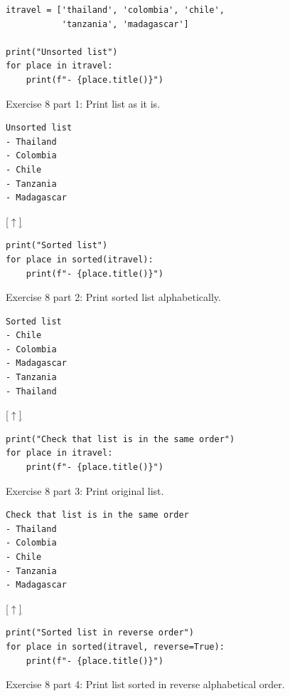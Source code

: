 \documentclass[10pt]{book}
\newenvironment{code}{\captionsetup{labelfont=bf, type=listing, name=Snippet, aboveskip=-3pt ,belowskip=15pt}}{}
\begin{document}
\begin{enumerate}
\label{org1a9df74}
\begin{code}
\begin{verbatim}
itravel = ['thailand', 'colombia', 'chile',
           'tanzania', 'madagascar']

print("Unsorted list")
for place in itravel:
    print(f"- {place.title()}")
\end{verbatim}
\caption{\label{lst:org1847dcf}Exercise 8 part 1: Print list as it is.}
\end{code}

\label{org1390465}
\begin{verbatim}
Unsorted list
- Thailand
- Colombia
- Chile
- Tanzania
- Madagascar
\end{verbatim}

\hyperref[sec:orge5f6a28]{{[}\(\uparrow\)]​}


\label{org4cc1f20}
\begin{code}
\begin{verbatim}
print("Sorted list")
for place in sorted(itravel):
    print(f"- {place.title()}")
\end{verbatim}
\caption{\label{lst:org3b2f0d3}Exercise 8 part 2: Print sorted list alphabetically.}
\end{code}

\label{org883c59e}
\begin{verbatim}
Sorted list
- Chile
- Colombia
- Madagascar
- Tanzania
- Thailand
\end{verbatim}

\hyperref[sec:orge5f6a28]{{[}\(\uparrow\)]​}

\label{orgd47260f}
\begin{code}
\begin{verbatim}
print("Check that list is in the same order")
for place in itravel:
    print(f"- {place.title()}")
\end{verbatim}
\caption{\label{lst:org457ede8}Exercise 8 part 3: Print original list.}
\end{code}

\label{orgf275447}
\begin{verbatim}
Check that list is in the same order
- Thailand
- Colombia
- Chile
- Tanzania
- Madagascar
\end{verbatim}

\hyperref[sec:orge5f6a28]{{[}\(\uparrow\)]​}

\label{orgc6344b4}
\begin{code}
\begin{verbatim}
print("Sorted list in reverse order")
for place in sorted(itravel, reverse=True):
    print(f"- {place.title()}")
\end{verbatim}
\caption{\label{lst:org81f8525}Exercise 8 part 4: Print list sorted in reverse alphabetical order.}
\end{code}


\end{enumerate}
\end{document}
